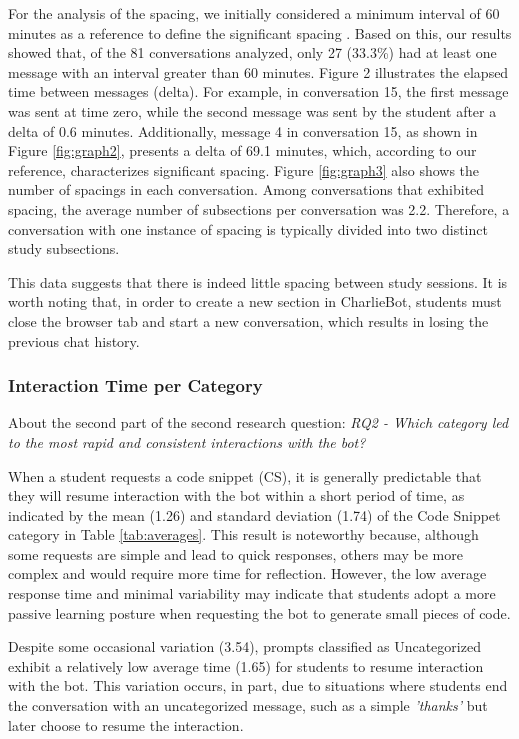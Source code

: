 \documentclass[a4paper,twoside]{article}
\begin{document}
For the analysis of the spacing, we initially considered a minimum interval of
60 minutes as a reference to define the significant spacing \citep{Gadella24}.
Based on this, our results showed that, of the 81 conversations analyzed, only
27 (33.3\%) had at least one message with an interval greater than 60 minutes.
Figure 2 illustrates the elapsed time between messages (delta). For example,
in conversation 15, the first message was sent at time zero, while the second
message was sent by the student after a delta of 0.6 minutes. Additionally,
message 4 in conversation 15, as shown in Figure \ref{fig:graph2}, presents a
delta of 69.1 minutes, which, according to our reference, characterizes
significant spacing. Figure \ref{fig:graph3} also shows the number of spacings
in each conversation. Among conversations that exhibited spacing, the
average number of subsections per conversation was 2.2. Therefore, a
conversation with one instance of spacing is typically divided into two distinct
study subsections.

This data suggests that there is indeed little spacing between study sessions.
It is worth noting that, in order to create a new section in CharlieBot,
students must close the browser tab and start a new conversation, which results
in losing the previous chat history.

\subsubsection{Interaction Time per Category}

About the second part of the second research question: \textit{RQ2 - Which
category led to the most rapid and consistent interactions with the bot?}

When a student requests a code snippet (CS), it is generally predictable that
they will resume interaction with the bot within a short period of time, as
indicated by the mean (1.26) and standard deviation (1.74) of the Code Snippet
category in Table \ref{tab:averages}. This result is noteworthy because,
although some requests are simple and lead to quick responses, others may be
more complex and would require more time for reflection. However, the low
average response time and minimal variability may indicate that students adopt a
more passive learning posture when requesting the bot to generate small pieces
of code.

Despite some occasional variation (3.54), prompts classified as Uncategorized
exhibit a relatively low average time (1.65) for students to resume interaction
with the bot. This variation occurs, in part, due to situations where students
end the conversation with an uncategorized message, such as a simple
\textit{'thanks'} but later choose to resume the interaction.
\end{document}
